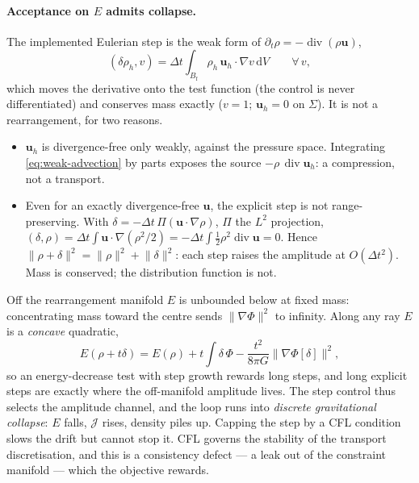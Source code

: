 \documentclass[11pt]{article}
\newcommand{\Jf}{\mathscr{J}}  %
\newcommand{\Bf}{B_{\mathrm{f}}}
\newcommand{\bu}{\mathbf{u}}
\newcommand{\dV}{\,\mathrm{d}V}
\renewcommand{\div}{\operatorname{div}}
\newcommand{\norm}[1]{\lVert #1 \rVert}
\begin{document}
\paragraph{Acceptance on $E$ admits collapse.} The implemented Eulerian
step is the weak form of $\partial_t\rho = -\div(\rho\bu)$,
\begin{equation}
  (\delta\rho_h, v) = \Delta t\int_{\Bf}\rho_h\,\bu_h\cdot\nabla v\dV
  \qquad\forall\,v ,
  \label{eq:weak-advection}
\end{equation}
which moves the derivative onto the test function (the control is never
differentiated) and conserves mass exactly ($v = 1$; $\bu_h = 0$ on
$\Sigma$). It is not a rearrangement, for two reasons.
\begin{itemize}
\item $\bu_h$ is divergence-free only weakly, against the pressure space.
  Integrating \eqref{eq:weak-advection} by parts exposes the source
  $-\rho\,\div\bu_h$: a compression, not a transport.
\item Even for an exactly divergence-free $\bu$, the explicit step is not
  range-preserving. With $\delta = -\Delta t\,\Pi(\bu\cdot\nabla\rho)$,
  $\Pi$ the $L^2$ projection, $(\delta,\rho) = \Delta t\int\bu\cdot\nabla
  (\rho^2/2) = -\Delta t\int\tfrac12\rho^2\div\bu = 0$. Hence
  $\norm{\rho + \delta}^2 = \norm{\rho}^2 + \norm{\delta}^2$: each step
  raises the amplitude at $O(\Delta t^2)$. Mass is conserved; the
  distribution function is not.
\end{itemize}
Off the rearrangement manifold $E$ is unbounded below at fixed mass:
concentrating mass toward the centre sends $\norm{\nabla\Phi}^2$ to
infinity. Along any ray $E$ is a \emph{concave} quadratic,
\begin{equation}
  E(\rho + t\delta) = E(\rho) + t\int\delta\,\Phi
  - \frac{t^2}{8\pi G}\norm{\nabla\Phi[\delta]}^2 ,
\end{equation}
so an energy-decrease test with step growth rewards long steps, and long
explicit steps are exactly where the off-manifold amplitude lives. The
step control thus selects the amplitude channel, and the loop runs into
\emph{discrete gravitational collapse}: $E$ falls, $\Jf $ rises, density
piles up. Capping the step by a CFL condition slows the drift but cannot
stop it. CFL governs the stability of the transport discretisation, and
this is a consistency defect --- a leak out of the constraint manifold
--- which the objective rewards.
\end{document}

